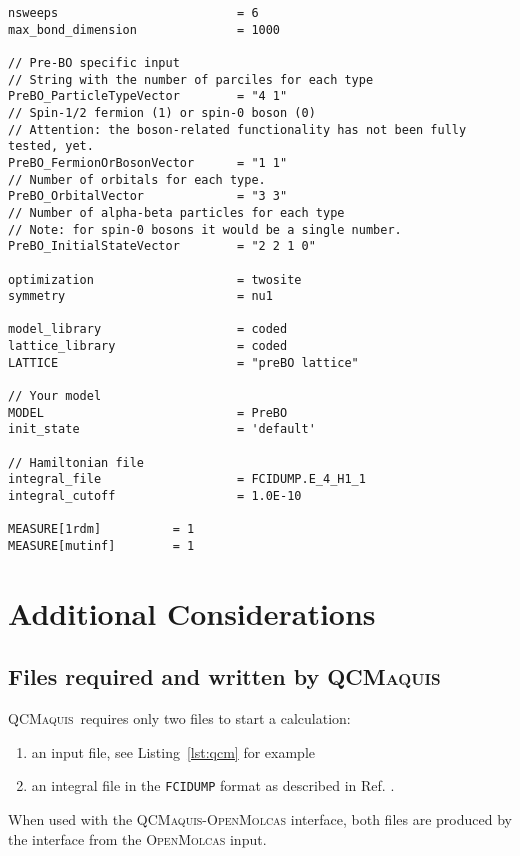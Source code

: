 \documentclass[bibliography=totoc,12pt,a4paper]{scrartcl}
\newcommand{\mol}{\textsc{OpenMolcas}}
\newcommand{\qcm}{\textsc{QCMaquis}}
\begin{document}
\begin{lstlisting}[language=qcmaquis,caption={Input example for a pre-BO DMRG-FCI
calculation},label=lst:preboinput]
nsweeps                         = 6
max_bond_dimension              = 1000

// Pre-BO specific input
// String with the number of parciles for each type
PreBO_ParticleTypeVector        = "4 1"
// Spin-1/2 fermion (1) or spin-0 boson (0)
// Attention: the boson-related functionality has not been fully tested, yet.
PreBO_FermionOrBosonVector      = "1 1"
// Number of orbitals for each type.
PreBO_OrbitalVector             = "3 3"
// Number of alpha-beta particles for each type
// Note: for spin-0 bosons it would be a single number.
PreBO_InitialStateVector        = "2 2 1 0"

optimization                    = twosite 
symmetry                        = nu1

model_library                   = coded
lattice_library                 = coded
LATTICE                         = "preBO lattice" 

// Your model
MODEL                           = PreBO
init_state                      = 'default'

// Hamiltonian file
integral_file                   = FCIDUMP.E_4_H1_1
integral_cutoff                 = 1.0E-10

MEASURE[1rdm]          = 1
MEASURE[mutinf]        = 1
\end{lstlisting}


\clearpage
\newpage


\section{Additional Considerations}


\subsection{Files required and written by \qcm}\label{sec:file-req-qcm}

\qcm\ requires only two files to start a calculation:
\begin{enumerate}
 \item an input file, see Listing~\ref{lst:qcm} for example
 \item an integral file in the \texttt{FCIDUMP} format as described in Ref. .
\end{enumerate}

When used with the \qcm{}-\mol{} interface, both files are produced by the interface from the \mol{} input.
\end{document}
